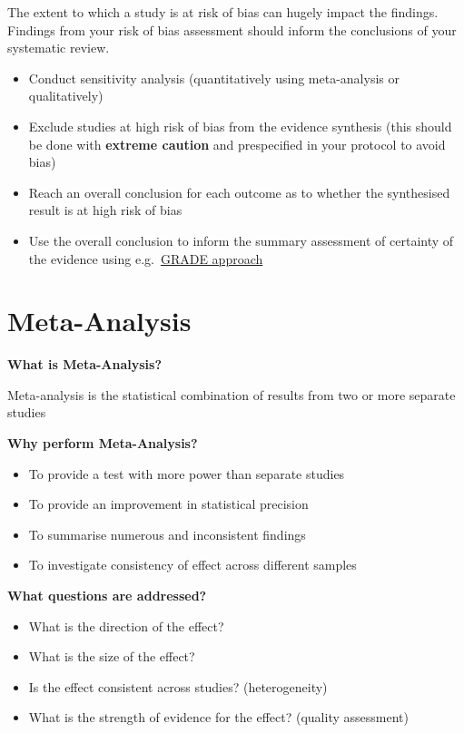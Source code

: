 \documentclass[
]{book}
\begin{document}
The extent to which a study is at risk of bias can hugely impact the findings. Findings from your risk of bias assessment should inform the conclusions of your systematic review.

\begin{itemize}
\item
  Conduct sensitivity analysis
  (quantitatively using meta-analysis or qualitatively)
\item
  Exclude studies at high risk of bias from the evidence synthesis
  (this should be done with \textbf{extreme caution} and prespecified in your protocol to avoid bias)
\item
  Reach an overall conclusion for each outcome as to whether the synthesised result is at high risk of bias
\item
  Use the overall conclusion to inform the summary assessment of certainty of the evidence using e.g.~\href{https://bestpractice.bmj.com/info/toolkit/learn-ebm/what-is-grade/}{GRADE approach}
\end{itemize}

\hypertarget{meta-analysis}{%
\chapter{Meta-Analysis}\label{meta-analysis}}

\textbf{What is Meta-Analysis?}

Meta-analysis is the statistical combination of results from two or more separate studies

\textbf{Why perform Meta-Analysis?}

\begin{itemize}
\item
  To provide a test with more power than separate studies
\item
  To provide an improvement in statistical precision
\item
  To summarise numerous and inconsistent findings
\item
  To investigate consistency of effect across different samples
\end{itemize}

\textbf{What questions are addressed?}

\begin{itemize}
\item
  What is the direction of the effect?
\item
  What is the size of the effect?
\item
  Is the effect consistent across studies? (heterogeneity)
\item
  What is the strength of evidence for the effect? (quality assessment)
\end{itemize}
\end{document}
